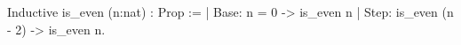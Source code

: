 Inductive is_even (n:nat) : Prop :=
  | Base: n = 0 -> 
          is_even n
  | Step: is_even (n - 2) -> 
          is_even n.